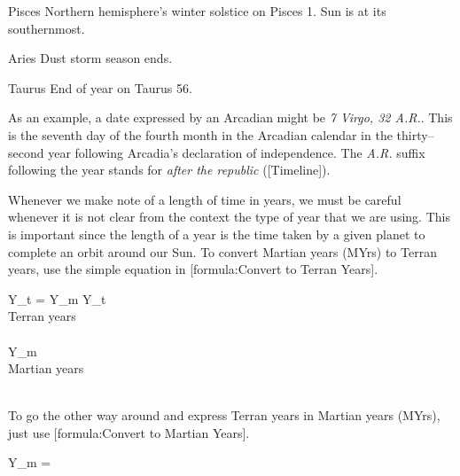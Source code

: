 {    \bTR
      \bTC Pisces \eTC
      \bTC \math{[270^{\circ}, 300^{\circ})} \eTC
       \eTC
       \eTC
      \bTC Northern hemisphere's winter solstice on Pisces 1. Sun is at its southernmost. \eTC
    \eTR
    
    \bTR
      \bTC Aries \eTC
      \bTC \math{[300^{\circ}, 330^{\circ})} \eTC
       \eTC
       \eTC
      \bTC Dust storm season ends. \eTC
    \eTR

    \bTR
      \bTC Taurus \eTC
      \bTC \math{[330^{\circ}, 360^{\circ})} \eTC
       \eTC
       \eTC
      \bTC End of year on Taurus 56. \eTC
    \eTR 
\eTABLEbody

\eTABLE
}

As an example, a date expressed by an Arcadian might be {\it 7 Virgo, 32 A.R.}. This is the seventh day of the fourth month in the Arcadian calendar in the thirty--second year following Arcadia's declaration of independence. The {\it A.R.} suffix following the year stands for {\it after the republic} ([Timeline]).


Whenever we make note of a length of time in years, we must be careful whenever it is not clear from the context the type of year that we are using. This is important since the length of a year is the time taken by a given planet to complete an orbit around our Sun. To convert Martian years (MYrs) to Terran years, use the simple equation in [formula:Convert to Terran Years].

\startformula
Y_t = Y_m 
\stopformula
\startlegend
\leg Y_t \\ Terran years \\ \\
\leg Y_m \\ Martian years\\ \\
\stoplegend
\crlf

To go the other way around and express Terran years in Martian years (MYrs), just use [formula:Convert to Martian Years].

\startformula
Y_m = 
\stopformula
\crlf

